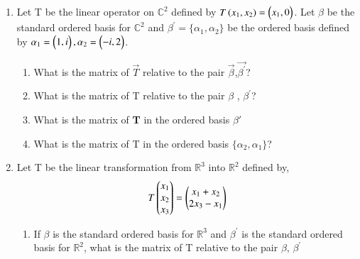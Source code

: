 \renewcommand{\theequation}{\theenumi}
\renewcommand{\thefigure}{\theenumi}
\begin{enumerate}[label=\thesubsection.\arabic*.,ref=\thesubsection.\theenumi]
%
\item Let T be the linear operator on $\mathbb{C}^{2}$ defined by $T\left(x_1 , x_2\right)=\begin{pmatrix}x_1 , 0\end{pmatrix}$.
Let $\beta$ be the standard ordered basis for $\mathbb{C}^{2}$ and $\beta^{'}=\{\alpha_1 , \alpha_2\}$
be the ordered basis defined by $\alpha_1 = \begin{pmatrix}1 , i\end{pmatrix} , \alpha_2 = \begin{pmatrix}-i , 2\end{pmatrix}$.
\begin{enumerate}
\item What is the matrix of $\vec{T}$ relative to the pair $\vec{\beta}$,$\vec{\beta^{'}}$?
%
\\
\solution

\item What is the matrix of T relative to the pair $\beta$ , $\beta^{'}$?
%
\\
\solution

\item What is the matrix of \textbf{T} in the ordered basis $\beta'$
%
\\
\solution

\item What is the matrix of T in the ordered basis $\{\alpha_2,\alpha_1\}$?
%
%
\\
\solution

\end{enumerate}
%
\item    Let T be the linear transformation from $\mathbb{R}^3$ into $\mathbb{R}^2$ defined by,
   \begin{align}
   T\begin{pmatrix}x_1\\x_2\\x_3\end{pmatrix}=\begin{pmatrix}x_1+x_2\\2x_3-x_1\end{pmatrix}
   \end{align}
\begin{enumerate}

\item    If $\beta$ is the standard ordered basis for $\mathbb{R}^3$ and $\beta^{\prime}$ is the standard ordered basis for $\mathbb{R}^2$, what is the matrix of T relative to the pair $\beta$, $\beta^{'}$
\end{enumerate}


\end{enumerate}
